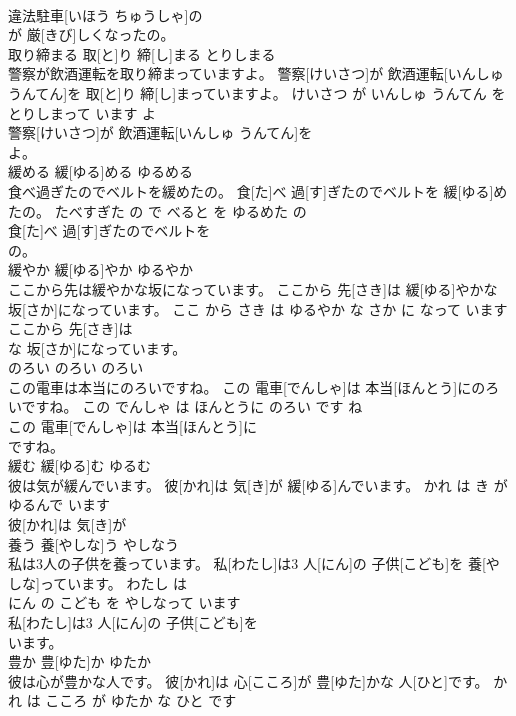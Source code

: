 \documentclass[8pt]{extreport}
\begin{document}
\begin{CJK}{UTF8}{min}
\\	違法駐車[いほう ちゅうしゃ]の
\\	が 厳[きび]しくなったの。			
\\	取り締まる	取[と]り 締[し]まる	とりしまる	
\\	警察が飲酒運転を取り締まっていますよ。	警察[けいさつ]が 飲酒運転[いんしゅ うんてん]を 取[と]り 締[し]まっていますよ。	けいさつ が いんしゅ うんてん を とりしまって います よ	
\\	警察[けいさつ]が 飲酒運転[いんしゅ うんてん]を
\\	よ。			
\\	緩める	緩[ゆる]める	ゆるめる	
\\	食べ過ぎたのでベルトを緩めたの。	食[た]べ 過[す]ぎたのでベルトを 緩[ゆる]めたの。	たべすぎた の で べると を ゆるめた の	
\\	食[た]べ 過[す]ぎたのでベルトを
\\	の。			
\\	緩やか	緩[ゆる]やか	ゆるやか	
\\	ここから先は緩やかな坂になっています。	ここから 先[さき]は 緩[ゆる]やかな 坂[さか]になっています。	ここ から さき は ゆるやか な さか に なって います	
\\	ここから 先[さき]は
\\	な 坂[さか]になっています。			
\\	のろい	のろい	のろい	
\\	この電車は本当にのろいですね。	この 電車[でんしゃ]は 本当[ほんとう]にのろいですね。	この でんしゃ は ほんとうに のろい です ね	
\\	この 電車[でんしゃ]は 本当[ほんとう]に
\\	ですね。			
\\	緩む	緩[ゆる]む	ゆるむ	
\\	彼は気が緩んでいます。	彼[かれ]は 気[き]が 緩[ゆる]んでいます。	かれ は き が ゆるんで います	
\\	彼[かれ]は 気[き]が
\\	養う	養[やしな]う	やしなう	
\\	私は3人の子供を養っています。	私[わたし]は3 人[にん]の 子供[こども]を 養[やしな]っています。	わたし は 
\\	にん の こども を やしなって います	
\\	私[わたし]は3 人[にん]の 子供[こども]を
\\	います。			
\\	豊か	豊[ゆた]か	ゆたか	
\\	彼は心が豊かな人です。	彼[かれ]は 心[こころ]が 豊[ゆた]かな 人[ひと]です。	かれ は こころ が ゆたか な ひと です	

\end{CJK}
\end{document}
